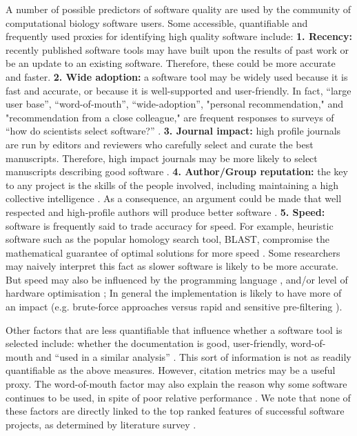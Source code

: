 \documentclass[fleqn,10pt]{SelfArx} %
\begin{document}
A number of possible predictors of software quality are used by the
community of computational biology software users. Some accessible,
quantifiable and frequently used proxies for identifying high quality
software include: \textbf{1. Recency:} recently published software
tools may have built upon the results of past work or be an update to
an existing software. Therefore, these could be more accurate and
faster. \textbf{2. Wide adoption:} a software tool may be widely used
because it is fast and accurate, or because it is well-supported and
user-friendly. In fact, “large user base”, “word-of-mouth”,
“wide-adoption”, "personal recommendation," and "recommendation from a
close colleague," are frequent responses to surveys of “how do
scientists select software?”
\cite{Hannay2009-cf,Joppa2013-vj,Loman2015-bw}. \textbf{3. Journal
  impact:} high profile journals are run by editors and reviewers who
carefully select and curate the best manuscripts. Therefore, high
impact journals may be more likely to select manuscripts describing
good software \cite{Garfield1955-wf}. \textbf{4. Author/Group
  reputation:} the key to any project is the skills of the people
involved, including maintaining a high collective intelligence
\cite{Joppa2013-vj,Woolley2010-ld,Cheruvelil2014-xn}. As a
consequence, an argument could be made that well respected and
high-profile authors will produce better software
\cite{Hirsch2005-mt,Bornmann2008-il}. \textbf{5. Speed:} software is
frequently said to trade accuracy for speed. For example, heuristic
software such as the popular homology search tool, BLAST, compromise
the mathematical guarantee of optimal solutions for more speed
\cite{Altschul1990-ht,Altschul1997-ga}. Some researchers may naively
interpret this fact as slower software is likely to be more
accurate. But speed may also be influenced by the programming language
\cite{Fourment2008-vl}, and/or level of hardware optimisation
\cite{Farrar2007-ky,Dematte2010-ph}; In general the implementation is
likely to have more of an impact (e.g. brute-force approaches versus
rapid and sensitive pre-filtering
\cite{Schaeffer1989-mu,Papadimitriou_undated-bo}).

Other factors that are less quantifiable that influence whether a
software tool is selected include: whether the documentation is good,
user-friendly, word-of-mouth and ``used in a similar analysis''
\cite{Loman2015-bw}. This sort of information is not as readily
quantifiable as the above measures. However, citation metrics may be a
useful proxy. The word-of-mouth factor may also explain the reason why
some software continues to be used, in spite of poor relative
performance \cite{Wadi2016-dj}. We note that none of these factors
are directly linked to the top ranked features of successful software
projects, as determined by literature survey \cite{nasir2011critical}.
\end{document}
